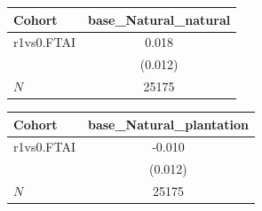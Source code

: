 {
\def\sym#1{\ifmmode^{#1}\else\(^{#1}\)\fi}
\begin{tabular}{l*{1}{c}}
\toprule
Cohort    &base\_Natural\_natural   \\
\midrule
r1vs0.FTAI&    0.018   \\
          &  (0.012)   \\
\midrule
\(N\)     &    25175   \\
\bottomrule
\end{tabular}
}
{
\def\sym#1{\ifmmode^{#1}\else\(^{#1}\)\fi}
\begin{tabular}{l*{1}{c}}
\toprule
Cohort    &base\_Natural\_plantation   \\
\midrule
r1vs0.FTAI&   -0.010   \\
          &  (0.012)   \\
\midrule
\(N\)     &    25175   \\
\bottomrule
\end{tabular}
}
